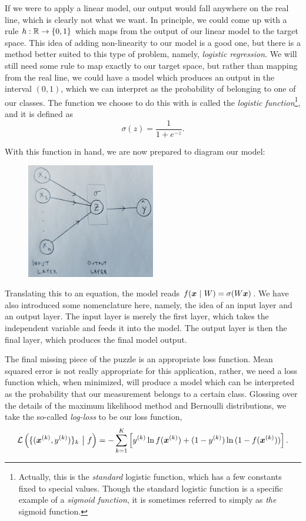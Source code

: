 If we were to apply a linear model, our output would fall anywhere on the real line, which is clearly not what we want.
In principle, we could come up with a rule $h: \mathbb{R} \rightarrow \{0, 1\}$ which maps from the output of our linear model to the target space.
This idea of adding non-linearity to our model is a good one, but there is a method better suited to this type of problem, namely, \textit{logistic regression}.
We will still need some rule to map exactly to our target space, but rather than mapping from the real line, we could have a model which produces an output in the interval $(0, 1)$, which we can interpret as the probability of belonging to one of our classes.
The function we choose to do this with is called the \textit{logistic function}\footnote{Actually, this is the \textit{standard} logistic function, which has a few constants fixed to special values. Though the standard logistic function is a specific example of a \textit{sigmoid function}, it is sometimes referred to simply as \textit{the} sigmoid function.}, and it is defined as
%
\begin{equation}
    \sigma(z) = \frac{1}{1 + e^{-z}}.
\end{equation}
%

With this function in hand, we are now prepared to diagram our model:
%
\begin{figure}[H]
    \centering
    \includegraphics[width=0.5\textwidth]{../figures/chapter_01/nn_diagram_logistic_regression.png}
\end{figure}
%
\noindent Translating this to an equation, the model reads $f(\bm{x} ~|~ W) = \sigma(W \bm{x})$.
We have also introduced some nomenclature here, namely, the idea of an input layer and an output layer.
The input layer is merely the first layer, which takes the independent variable and feeds it into the model.
The output layer is then the final layer, which produces the final model output.

The final missing piece of the puzzle is an appropriate loss function.
Mean squared error is not really appropriate for this application, rather, we need a loss function which, when minimized, will produce a model which can be interpreted as the probability that our measurement belongs to a certain class.
Glossing over the details of the maximum likelihood method and Bernoulli distributions, we take the so-called \textit{log-loss} to be our loss function,
%
\begin{equation}
    \mathcal{L}\left(\{(\bm{x}^{(k)}, y^{(k)})\}_k ~\big|~ f\right) =
    -\sum_{k=1}^K \left[y^{(k)} \ln{f(\bm{x}^{(k)}) + (1 - y^{(k)}) \ln{(1 - f(\bm{x}^{(k)}))}}\right].
\end{equation}
%

